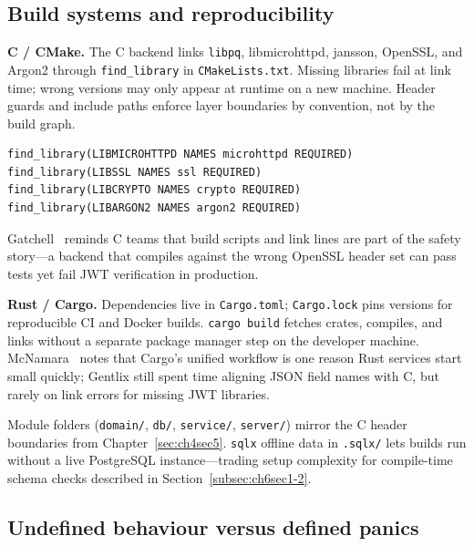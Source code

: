 \subsection{Build systems and reproducibility}
\label{subsec:ch8sec1build}

\par \textbf{C / CMake.} The C backend links \texttt{libpq}, libmicrohttpd, jansson, OpenSSL, 
and Argon2 through \texttt{find\_library} in \texttt{CMakeLists.txt}. Missing libraries fail 
at link time; wrong versions may only appear at runtime on a new machine. Header guards and 
include paths enforce layer boundaries by convention, not by the build graph.

\begin{lstlisting}[language=make, caption={CMakeLists.txt (excerpt) --- Each dependency
must be discovered on the host or in the Docker build stage.}]
find_library(LIBMICROHTTPD NAMES microhttpd REQUIRED)
find_library(LIBSSL NAMES ssl REQUIRED)
find_library(LIBCRYPTO NAMES crypto REQUIRED)
find_library(LIBARGON2 NAMES argon2 REQUIRED)
\end{lstlisting}

\par Gatchell~\cite{Gatchell2003} reminds C teams that build scripts and link lines are part 
of the safety story---a backend that compiles against the wrong OpenSSL header set can pass 
tests yet fail JWT verification in production.

\par \textbf{Rust / Cargo.} Dependencies live in \texttt{Cargo.toml}; \texttt{Cargo.lock} 
pins versions for reproducible CI and Docker builds. \texttt{cargo build} fetches crates, 
compiles, and links without a separate package manager step on the developer machine. 
McNamara~\cite{McNamara2021} notes that Cargo's unified workflow is one reason Rust services 
start small quickly; Gentlix still spent time aligning JSON field names with C, but rarely 
on link errors for missing JWT libraries.

\par Module folders (\texttt{domain/}, \texttt{db/}, \texttt{service/}, \texttt{server/}) 
mirror the C header boundaries from Chapter~\ref{sec:ch4sec5}. \texttt{sqlx} offline data 
in \texttt{.sqlx/} lets builds run without a live PostgreSQL instance---trading setup 
complexity for compile-time schema checks described in Section~\ref{subsec:ch6sec1-2}.

\subsection{Undefined behaviour versus defined panics}
\label{subsec:ch8sec1ub}

